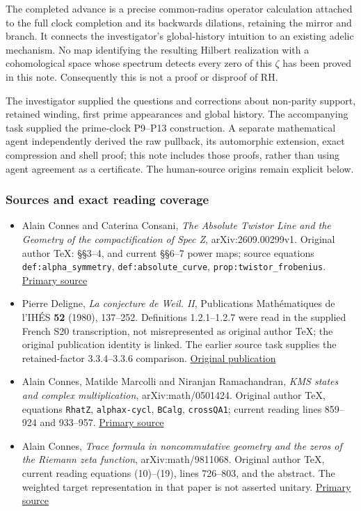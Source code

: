 \documentclass[
]{article}
\providecommand{\tightlist}{%
  \setlength{\itemsep}{0pt}\setlength{\parskip}{0pt}}
\begin{document}
The completed advance is a precise common-radius operator calculation
attached to the full clock completion and its backwards dilations,
retaining the mirror and branch. It connects the investigator's
global-history intuition to an existing adelic mechanism. No map
identifying the resulting Hilbert realization with a cohomological space
whose spectrum detects every zero of this \(\zeta\) has been proved in
this note. Consequently this is not a proof or disproof of RH.

The investigator supplied the questions and corrections about non-parity
support, retained winding, first prime appearances and global history.
The accompanying task supplied the prime-clock P9--P13 construction. A
separate mathematical agent independently derived the raw pullback, its
automorphic extension, exact compression and shell proof; this note
includes those proofs, rather than using agent agreement as a
certificate. The human-source origins remain explicit below.

\subsubsection{Sources and exact reading
coverage}\label{sources-and-exact-reading-coverage}

\begin{itemize}
\tightlist
\item
  Alain Connes and Caterina Consani, \emph{The Absolute Twistor Line and
  the Geometry of the compactification of Spec Z}, arXiv:2609.00299v1.
  Original author TeX: §§3--4, and current §§6--7 power maps; source
  equations \texttt{def:alpha\_symmetry}, \texttt{def:absolute\_curve},
  \texttt{prop:twistor\_frobenius}.
  \href{https://arxiv.org/html/2609.00299v1}{Primary source}
\item
  Pierre Deligne, \emph{La conjecture de Weil. II}, Publications
  Mathématiques de l'IHÉS \textbf{52} (1980), 137--252. Definitions
  1.2.1--1.2.7 were read in the supplied French S20 transcription, not
  misrepresented as original author TeX; the original publication
  identity is linked. The earlier source task supplies the
  retained-factor 3.3.4--3.3.6 comparison.
  \href{https://www.numdam.org/item/PMIHES_1980__52__137_0/}{Original
  publication}
\item
  Alain Connes, Matilde Marcolli and Niranjan Ramachandran, \emph{KMS
  states and complex multiplication}, arXiv:math/0501424. Original
  author TeX, equations \texttt{RhatZ}, \texttt{alphax-cycl},
  \texttt{BCalg}, \texttt{crossQA1}; current reading lines 859--924 and
  933--957. \href{https://arxiv.org/abs/math/0501424}{Primary source}
\item
  Alain Connes, \emph{Trace formula in noncommutative geometry and the
  zeros of the Riemann zeta function}, arXiv:math/9811068. Original
  author TeX, current reading equations (10)--(19), lines 726--803, and
  the abstract. The weighted target representation in that paper is not
  asserted unitary. \href{https://arxiv.org/abs/math/9811068}{Primary
  source}
\end{itemize}
\end{document}

